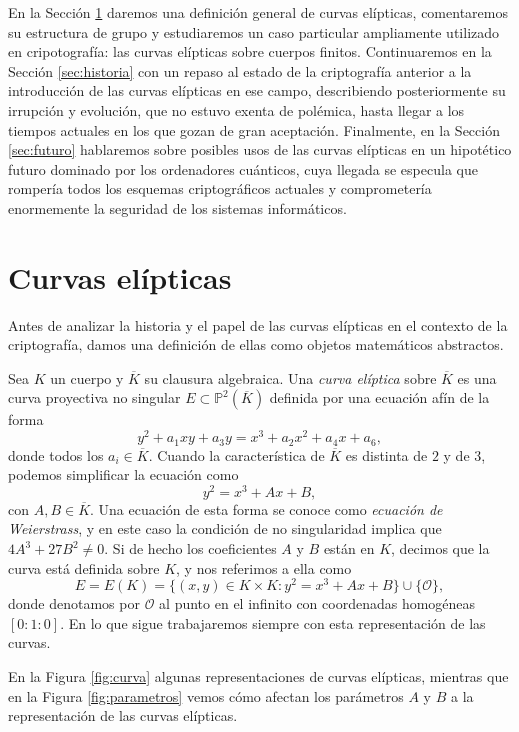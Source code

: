 \documentclass[
  a4paper,
  12pt,
  spanish,
]{scrartcl}
\begin{document}
En la Sección \ref{sec:curvas} daremos una definición general de curvas elípticas, comentaremos su estructura de grupo y estudiaremos un caso particular ampliamente utilizado en cripotografía: las curvas elípticas sobre cuerpos finitos. Continuaremos en la Sección \ref{sec:historia} con un repaso al estado de la criptografía anterior a la introducción de las curvas elípticas en ese campo, describiendo posteriormente su irrupción y evolución, que no estuvo exenta de polémica, hasta llegar a los tiempos actuales en los que gozan de gran aceptación. Finalmente, en la Sección \ref{sec:futuro} hablaremos sobre posibles usos de las curvas elípticas en un hipotético futuro dominado por los ordenadores cuánticos, cuya llegada se especula que rompería todos los esquemas criptográficos actuales y comprometería enormemente la seguridad de los sistemas informáticos.




\section{Curvas elípticas}
\label{sec:curvas}

Antes de analizar la historia y el papel de las curvas elípticas en el contexto de la criptografía, damos una definición de ellas como objetos matemáticos abstractos.

    Sea $K$ un cuerpo y $\overline{K}$ su clausura algebraica. Una \textit{curva elíptica} sobre $\overline{K}$ es una curva proyectiva no singular $E \subset \mathbb{P}^2(\overline{K})$ definida por una ecuación afín de la forma \[ y^2 + a_1xy + a_3y = x^3 +a_2x^2 + a_4x + a_6, \] donde todos los $a_i \in \overline{K}$.
    Cuando la característica de $\overline{K}$ es distinta de $2$ y de $3$, podemos simplificar la ecuación como \[ y^2 = x^3 + Ax + B, \] con $A,B \in \overline{K}$. Una ecuación de esta forma se conoce como \textit{ecuación de Weierstrass}, y en este caso la condición de no singularidad implica que $4A^3 + 27B^2 \neq 0$. Si de hecho los coeficientes $A$ y $B$ están en $K$, decimos que la curva está definida sobre $K$, y nos referimos a ella como \[ E = E(K) = \{ (x, y) \in K \times K : y^2 = x^3 + Ax + B\} \cup \{\mathcal{O}\}, \] donde denotamos por $\mathcal{O}$ al punto en el infinito con coordenadas homogéneas $[0:1:0]$. En lo que sigue trabajaremos siempre con esta representación de las curvas.

En la Figura \ref{fig:curva} algunas representaciones de curvas elípticas, mientras que en la Figura \ref{fig:parametros} vemos cómo afectan los parámetros $A$ y $B$ a la representación de las curvas elípticas.
\end{document}
